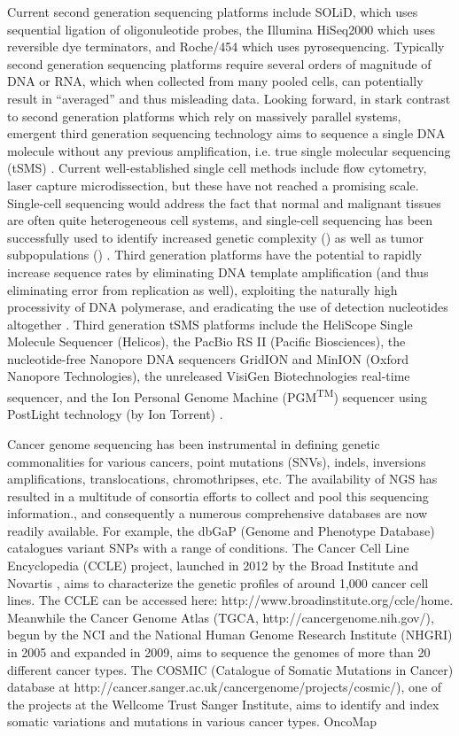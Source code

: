 \documentclass[12pt]{article}
\begin{document}
Current second generation sequencing platforms include SOLiD, which uses sequential ligation of oligonuleotide probes, the Illumina HiSeq2000 which uses reversible dye terminators, and Roche/454 which uses pyrosequencing. Typically second generation sequencing platforms require several orders of magnitude of DNA or RNA, which when collected from many pooled cells, can potentially result in \textquotedblleft averaged\textquotedblright \: and thus misleading data. Looking forward, in stark contrast to second generation platforms which rely on massively parallel systems, emergent third generation sequencing technology aims to sequence a single DNA molecule without any previous amplification, i.e. true single molecular sequencing (tSMS) \cite{Pareek2011}. Current well-established single cell methods include flow cytometry, laser capture microdissection, but these have not reached a promising scale. Single-cell sequencing would address the fact that normal and malignant tissues are often quite heterogeneous cell systems, and single-cell sequencing has been successfully used to identify increased genetic complexity () as well as tumor subpopulations () \cite{Soon2013}. Third generation platforms have the potential to rapidly increase sequence rates by eliminating DNA template amplification (and thus eliminating error from replication as well), exploiting the naturally high processivity of DNA polymerase, and eradicating the use of detection nucleotides altogether \cite{Pareek2011}. Third generation tSMS platforms include the HeliScope Single Molecule Sequencer (Helicos), the PacBio\textregistered\: RS II (Pacific Biosciences), the nucleotide-free Nanopore DNA sequencers GridION and MinION (Oxford Nanopore Technologies\textregistered), the unreleased VisiGen Biotechnologies real-time sequencer, and the Ion Personal Genome Machine (PGM\textsuperscript{TM}) sequencer using PostLight technology (by Ion Torrent) \cite{Pareek2011}. 
	
Cancer genome sequencing has been instrumental in defining genetic commonalities for various cancers, point mutations (SNVs), indels, inversions amplifications, translocations, chromothripses, etc. The availability of NGS has resulted in a multitude of consortia efforts to collect and pool this sequencing information., and consequently a numerous comprehensive databases are now readily available. For example, the dbGaP (Genome and Phenotype Database) catalogues variant SNPs with a range of conditions. The Cancer Cell Line Encyclopedia (CCLE) project, launched in 2012 by the Broad Institute and Novartis \cite{Barretina2012}, aims to characterize the genetic profiles of around 1,000 cancer cell lines. The CCLE can be accessed here: http://www.broadinstitute.org/ccle/home. Meanwhile the Cancer Genome Atlas (TGCA, http://cancergenome.nih.gov/), begun by the NCI and the National Human Genome Research Institute (NHGRI) in 2005 and expanded in 2009, aims to sequence the genomes of more than 20 different cancer types. The COSMIC (Catalogue of Somatic Mutations in Cancer) database at http://cancer.sanger.ac.uk/cancergenome/projects/cosmic/), one of the projects at the Wellcome Trust Sanger Institute, aims to identify and index somatic variations and mutations in various cancer types. OncoMap
	
\end{document}
